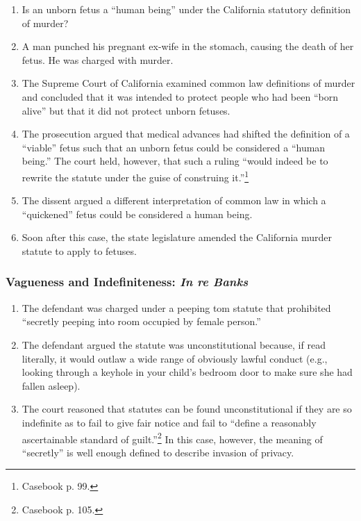 \begin{enumerate}
    \item Is an unborn fetus a ``human being'' under the California statutory definition of murder?
    \item A man punched his pregnant ex-wife in the stomach, causing the death of her fetus. He was charged with murder.
    \item The Supreme Court of California examined common law definitions of murder and concluded that it was intended to protect people who had been ``born alive'' but that it did not protect unborn fetuses.
    \item The prosecution argued that medical advances had shifted the definition of a ``viable'' fetus such that an unborn fetus could be considered a ``human being.'' The court held, however, that such a ruling ``would indeed be to rewrite the statute under the guise of construing it.''\footnote{Casebook p. 99.}
    \item The dissent argued a different interpretation of common law in which a ``quickened'' fetus could be considered a human being.
    \item Soon after this case, the state legislature amended the California murder statute to apply to fetuses.
\end{enumerate}

\subsubsection{Vagueness and Indefiniteness: \emph{In re Banks}}

\begin{enumerate}
    \item The defendant was charged under a peeping tom statute that prohibited ``secretly peeping into room occupied by female person.''
    \item The defendant argued the statute was unconstitutional because, if read literally, it would outlaw a wide range of obviously lawful conduct (e.g., looking through a keyhole in your child's bedroom door to make sure she had fallen asleep).
    \item The court reasoned that statutes can be found unconstitutional if they are so indefinite as to fail to give fair notice and fail to ``define a reasonably ascertainable standard of guilt.''\footnote{Casebook p. 105.} In this case, however, the meaning of ``secretly'' is well enough defined to describe invasion of privacy.
\end{enumerate}

